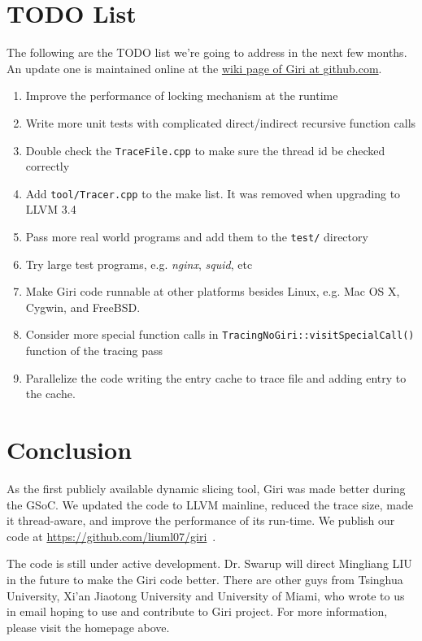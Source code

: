 \documentclass[DIV=calc, paper=a4, fontsize=11pt, twocolumn]{scrartcl}
\begin{document}
\section{TODO List}
The following are the TODO list we're going to address in the next few months.
An update one is maintained online at the \href{https://github.com/liuml07/giri/wiki/TODO}{wiki page of Giri at github.com}.
\label{sec:todo}
\begin{enumerate}
	\item Improve the performance of locking mechanism at the runtime
	\item Write more unit tests with complicated direct/indirect recursive function calls
	\item Double check the \texttt{TraceFile.cpp} to make sure the thread id be checked correctly
	\item Add \texttt{tool/Tracer.cpp} to the make list. It was removed when upgrading to LLVM 3.4
	\item Pass more real world programs and add them to the \texttt{test/} directory
	\item Try large test programs, e.g. \emph{nginx}, \emph{squid}, etc
	\item Make Giri code runnable at other platforms besides Linux, e.g. Mac OS X, Cygwin, and FreeBSD.
	\item Consider more special function calls in \texttt{TracingNoGiri::visitSpecialCall()} function of the tracing pass
	\item Parallelize the code writing the entry cache to trace file and adding entry to the cache.
\end{enumerate}

\section{Conclusion}
\label{sec:contact}
As the first publicly available dynamic slicing tool,
Giri was made better during the GSoC. We updated the code to LLVM mainline, reduced the trace size, made it thread-aware, and improve the performance of its run-time.
We publish our code at \href{https://github.com/liuml07/giri}{https://github.com/liuml07/giri}~\cite{giri}.

The code is still under active development.
Dr. Swarup will direct Mingliang LIU in the future to make the Giri code better.
There are other guys from Tsinghua University, Xi'an Jiaotong University and University of Miami,
who wrote to us in email hoping to use and contribute to Giri project.
For more information, please visit the homepage above.


 
\end{document}
